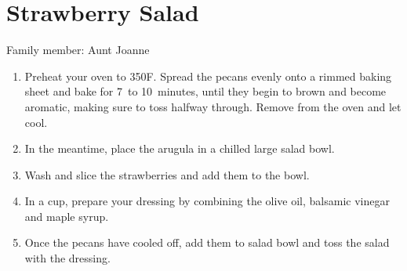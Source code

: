 \chapter{Strawberry Salad}
\label{ch:strawberrysalad}


Family member: Aunt Joanne

\begin{enumerate}
    \item Preheat your oven to 350\degree F. Spread the pecans evenly onto a rimmed baking sheet and bake for 7~to 10~minutes, until they begin to brown and become aromatic, making sure to toss halfway through. Remove from the oven and let cool.
    \item In the meantime, place the arugula in a chilled large salad bowl.
    \item Wash and slice the strawberries and add them to the bowl.
    \item In a cup, prepare your dressing by combining the olive oil, balsamic vinegar and maple syrup.
    \item Once the pecans have cooled off, add them to salad bowl and toss the salad with the dressing.
\end{enumerate}
